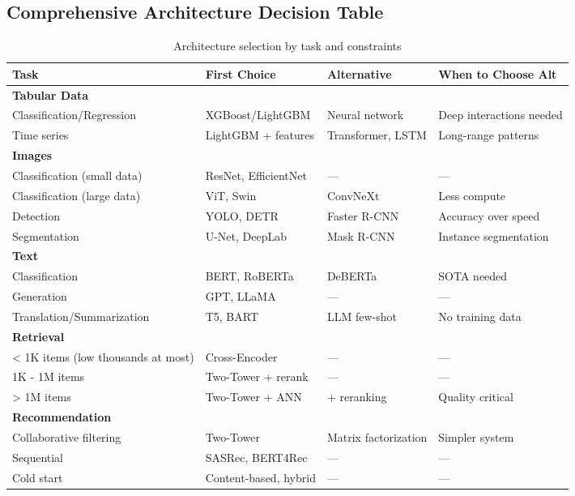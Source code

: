 \subsection{Comprehensive Architecture Decision Table}

\begin{table}[H]
\centering
\caption{Architecture selection by task and constraints}
\begin{tabularx}{\textwidth}{lXXX}
\toprule
\textbf{Task} & \textbf{First Choice} & \textbf{Alternative} & \textbf{When to Choose Alt} \\
\midrule
\multicolumn{4}{l}{\textbf{Tabular Data}} \\
Classification/Regression & XGBoost/LightGBM & Neural network & Deep interactions needed \\
Time series & LightGBM + features & Transformer, LSTM & Long-range patterns \\
\midrule
\multicolumn{4}{l}{\textbf{Images}} \\
Classification (small data) & ResNet, EfficientNet & — & — \\
Classification (large data) & ViT, Swin & ConvNeXt & Less compute \\
Detection & YOLO, DETR & Faster R-CNN & Accuracy over speed \\
Segmentation & U-Net, DeepLab & Mask R-CNN & Instance segmentation \\
\midrule
\multicolumn{4}{l}{\textbf{Text}} \\
Classification & BERT, RoBERTa & DeBERTa & SOTA needed \\
Generation & GPT, LLaMA & — & — \\
Translation/Summarization & T5, BART & LLM few-shot & No training data \\
\midrule
\multicolumn{4}{l}{\textbf{Retrieval}} \\
< 1K items (low thousands at most) & Cross-Encoder & — & — \\
1K - 1M items & Two-Tower + rerank & — & — \\
> 1M items & Two-Tower + ANN & + reranking & Quality critical \\
\midrule
\multicolumn{4}{l}{\textbf{Recommendation}} \\
Collaborative filtering & Two-Tower & Matrix factorization & Simpler system \\
Sequential & SASRec, BERT4Rec & — & — \\
Cold start & Content-based, hybrid & — & — \\
\bottomrule
\end{tabularx}
\end{table}


